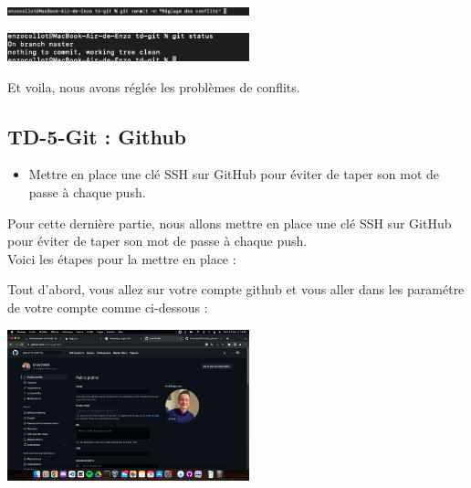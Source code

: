 \documentclass[12pt]{article}
\begin{document}
\vspace{0.3cm}

\begin{center}
  \includegraphics[width=7cm]{Image-TD-Git-4/git-commit-conflits.png}
\end{center}

\vspace{0.3cm}

\begin{center}
  \includegraphics[width=7cm]{Image-TD-Git-4/git-status.png}
\end{center}

\vspace{0.3cm}

Et voila, nous avons réglée les problèmes de conflits.

\newpage

\subsection{TD-5-Git : Github}

\vspace{0.3cm}

\begin{itemize}
  \item Mettre en place une clé SSH sur GitHub pour éviter de taper son mot de passe à chaque push.
\end{itemize}

\vspace{0.3cm}

Pour cette dernière partie, nous allons mettre en place une clé SSH sur GitHub pour éviter de taper son mot de passe à chaque push. \\

Voici les étapes pour la mettre en place : 

\vspace{0.3cm}

Tout d'abord, vous allez sur votre compte github et vous aller dans les paramétre de votre compte comme ci-dessous : 

\vspace{0.3cm}

\begin{center}
  \includegraphics[width=7cm]{Image-TD-Git-5/setting-github.png}
\end{center}
\end{document}

